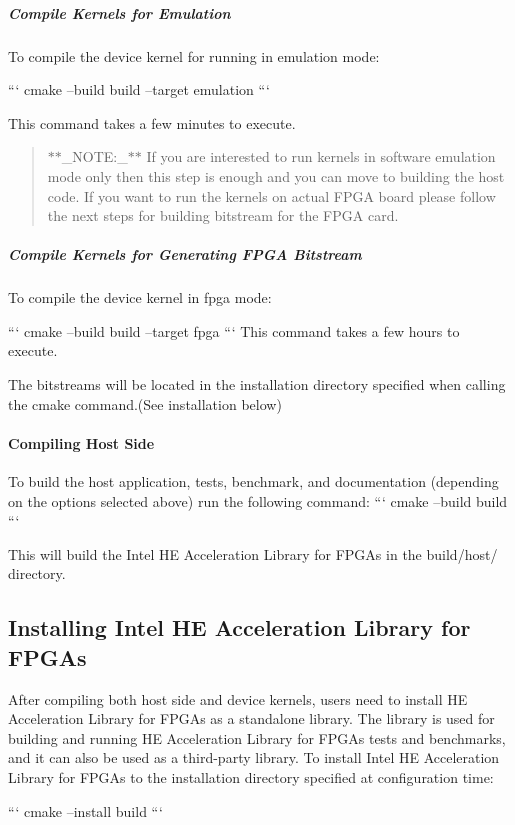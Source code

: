 \subparagraph*{Compile Kernels for Emulation}

To compile the device kernel for running in emulation mode\-: \par
 ``` cmake --build build --target emulation ```

This command takes a few minutes to execute.

\begin{quotation}
$\ast$$\ast$\-\_\-\-N\-O\-T\-E\-:\-\_\-$\ast$$\ast$ If you are interested to run kernels in software emulation mode only then this step is enough and you can move to building the host code. If you want to run the kernels on actual F\-P\-G\-A board please follow the next steps for building bitstream for the F\-P\-G\-A card.

\end{quotation}


\subparagraph*{Compile Kernels for Generating F\-P\-G\-A Bitstream}

To compile the device kernel in fpga mode\-: \par
 ``` cmake --build build --target fpga ``` This command takes a few hours to execute.

The bitstreams will be located in the installation directory specified when calling the cmake command.(See installation below) \par


\paragraph*{Compiling Host Side}

To build the host application, tests, benchmark, and documentation (depending on the options selected above) run the following command\-: ``` cmake --build build ```

This will build the Intel H\-E Acceleration Library for F\-P\-G\-As in the {\ttfamily build/host/} directory. \par


\subsection*{Installing Intel H\-E Acceleration Library for F\-P\-G\-As}

After compiling both host side and device kernels, users need to install H\-E Acceleration Library for F\-P\-G\-As as a standalone library. The library is used for building and running H\-E Acceleration Library for F\-P\-G\-As tests and benchmarks, and it can also be used as a third-\/party library. To install Intel H\-E Acceleration Library for F\-P\-G\-As to the installation directory specified at configuration time\-: \par
 ``` cmake --install build ```

